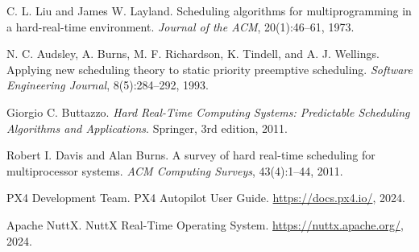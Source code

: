 \documentclass[12pt,a4paper]{article}
\begin{document}
\begin{thebibliography}{99}
 C. L. Liu and James W. Layland. Scheduling algorithms for multiprogramming in a hard-real-time environment. \textit{Journal of the ACM}, 20(1):46--61, 1973.

 N. C. Audsley, A. Burns, M. F. Richardson, K. Tindell, and A. J. Wellings. Applying new scheduling theory to static priority preemptive scheduling. \textit{Software Engineering Journal}, 8(5):284--292, 1993.

 Giorgio C. Buttazzo. \textit{Hard Real-Time Computing Systems: Predictable Scheduling Algorithms and Applications}. Springer, 3rd edition, 2011.

 Robert I. Davis and Alan Burns. A survey of hard real-time scheduling for multiprocessor systems. \textit{ACM Computing Surveys}, 43(4):1--44, 2011.

 PX4 Development Team. PX4 Autopilot User Guide. \url{https://docs.px4.io/}, 2024.

 Apache NuttX. NuttX Real-Time Operating System. \url{https://nuttx.apache.org/}, 2024.
\end{thebibliography}
\end{document}
